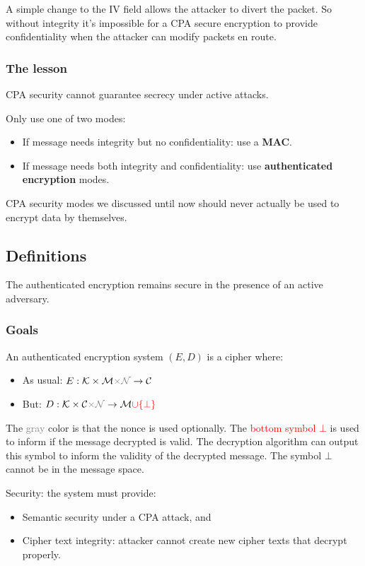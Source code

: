 \documentclass[12pt]{book}
\begin{document}
A simple change to the IV field allows the attacker to divert the packet. So without integrity it's impossible for a CPA secure encryption to provide confidentiality when the attacker can modify packets en route.

\subsubsection{The lesson}
CPA security cannot guarantee secrecy under active attacks.

Only use one of two modes:
\begin{itemize}
	\item If message needs integrity but no confidentiality: use a \textbf{MAC}.
	\item If message needs both integrity and confidentiality: use \textbf{authenticated encryption} modes.
\end{itemize}

CPA security modes we discussed until now should never actually be used to encrypt data by themselves.

\subsection{Definitions}
The authenticated encryption remains secure in the presence of an active adversary.

\subsubsection{Goals}
An authenticated encryption system $(E,D)$ is a cipher where:
\begin{itemize}
	\item[] As usual: $E:\mathcal{K}\times\mathcal{M}\textcolor{gray}{\times\mathcal{N}}\rightarrow\mathcal{C}$
	\item[] But: $D:\mathcal{K}\times\mathcal{C}\textcolor{gray}{\times\mathcal{N}}\rightarrow\mathcal{M}\textcolor{red}{\cup\{\bot\}}$
\end{itemize}The \textcolor{gray}{gray} color is that the nonce is used optionally. The \textcolor{red}{bottom symbol $\bot$} is used to inform if the message decrypted is valid. The decryption algorithm can output this symbol to inform the validity of the decrypted message. The symbol $\bot$ cannot be in the message space.

Security: the system must provide:
\begin{itemize}
	\item Semantic security under a CPA attack, and
	\item Cipher text integrity: attacker cannot create new cipher texts that decrypt properly.
\end{itemize}
\end{document}
